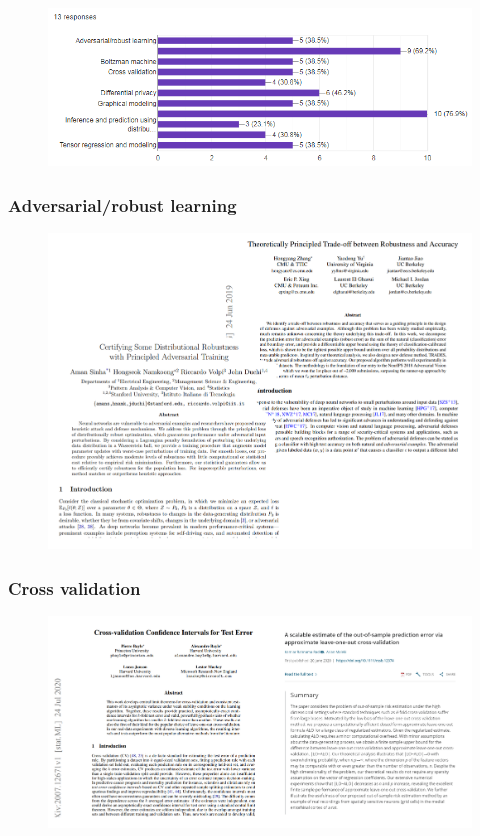 \documentclass[10pt]{beamer}
\begin{document}
 

\begin{frame}
\begin{figure}[h!]
\centering
\includegraphics[scale=0.575]{f2.png}
\end{figure} 
\end{frame}
 

\begin{frame}
\frametitle{Adversarial/robust learning}
\begin{figure}[h!]
\centering
\includegraphics[scale=0.225]{f3.png} 
\end{figure}  
\end{frame}
  




\begin{frame}
\frametitle{Cross validation}
\begin{figure}[h!]
\centering
\includegraphics[scale=0.245]{f4.png} 
\end{figure}  
\end{frame}
  
\end{document}
